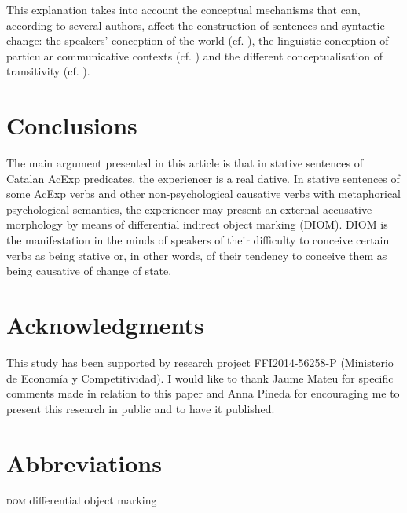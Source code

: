 \documentclass[output=paper,colorlinks,citecolor=brown,modfonts,nonflat]{langsci/langscibook}
\begin{document}
This explanation takes into account the conceptual mechanisms that can, according to several authors, affect the construction of sentences and syntactic change: the speakers’ conception of the world (cf. \citealt{Ramos2002}), the linguistic conception of particular communicative contexts (cf. \citealt{Rossello2008}) and the different conceptualisation of transitivity (cf. \citealt{Ynglès2011, Pineda2012}).

\section{Conclusions}\label{sec:royo:6}

The main argument presented in this article is that in stative sentences of Catalan AcExp predicates, the experiencer is a real dative. In stative sentences of some AcExp verbs and other non-psychological causative verbs with metaphorical psychological semantics, the experiencer may present an external accusative morphology by means of differential indirect object marking (DIOM). DIOM is the manifestation in the minds of speakers of their difficulty to conceive certain verbs as being stative or, in other words, of their tendency to conceive them as being causative of change of state.

\section*{Acknowledgments} This study has been supported by research project FFI2014-56258-P ({Ministerio de Economía y Competitividad}). I would like to thank Jaume Mateu for specific comments made in relation to this paper and Anna Pineda for encouraging me to present this research in public and to have it published.

\section*{Abbreviations} 
\textsc{dom} differential object marking

\sloppy\printbibliography[heading=subbibliography,notkeyword=this]
\end{document}
